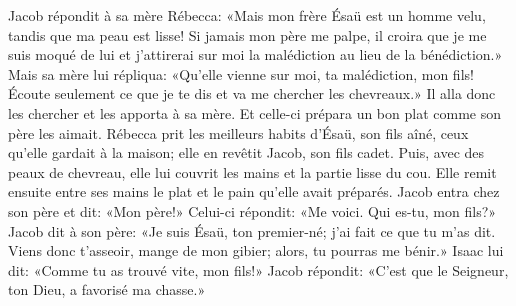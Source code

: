 Jacob répondit à sa mère Rébecca:
	«Mais mon frère Ésaü est un homme velu, tandis que ma peau est lisse!
	Si jamais mon père me palpe, il croira que je me suis moqué de lui
	et j’attirerai sur moi la malédiction au lieu de la bénédiction.»
Mais sa mère lui répliqua:
	«Qu’elle vienne sur moi, ta malédiction, mon fils!
	Écoute seulement ce que je te dis et va me chercher les chevreaux.»
Il alla donc les chercher et les apporta à sa mère.
Et celle-ci prépara un bon plat comme son père les aimait.
Rébecca prit les meilleurs habits d’Ésaü, son fils aîné,
	ceux qu’elle gardait à la maison;
	elle en revêtit Jacob, son fils cadet.
Puis, avec des peaux de chevreau,
	elle lui couvrit les mains et la partie lisse du cou.
Elle remit ensuite entre ses mains le plat et le pain qu’elle avait préparés.
Jacob entra chez son père et dit: «Mon père!»
	Celui-ci répondit: «Me voici. Qui es-tu, mon fils?»
Jacob dit à son père: «Je suis Ésaü, ton premier-né;
	j’ai fait ce que tu m’as dit.
Viens donc t’asseoir, mange de mon gibier; alors, tu pourras me bénir.»
Isaac lui dit: «Comme tu as trouvé vite, mon fils!»
	Jacob répondit: «C’est que le Seigneur, ton Dieu, a favorisé ma chasse.»
